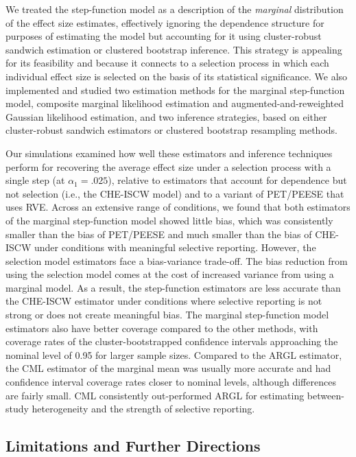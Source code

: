 \documentclass[
  man, donotrepeattitle,floatsintext]{apa7}
\begin{document}
We treated the step-function model as a description of the \emph{marginal} distribution of the effect size estimates, effectively ignoring the dependence structure for purposes of estimating the model but accounting for it using cluster-robust sandwich estimation or clustered bootstrap inference.
This strategy is appealing for its feasibility and because it connects to a selection process in which each individual effect size is selected on the basis of its statistical significance.
We also implemented and studied two estimation methods for the marginal step-function model, composite marginal likelihood estimation and augmented-and-reweighted Gaussian likelihood estimation, and two inference strategies, based on either cluster-robust sandwich estimators or clustered bootstrap resampling methods.

Our simulations examined how well these estimators and inference techniques perform for recovering the average effect size under a selection process with a single step (at \(\alpha_1 = .025\)), relative to estimators that account for dependence but not selection (i.e., the CHE-ISCW model) and to a variant of PET/PEESE that uses RVE.
Across an extensive range of conditions, we found that both estimators of the marginal step-function model showed little bias, which was consistently smaller than the bias of PET/PEESE and much smaller than the bias of CHE-ISCW under conditions with meaningful selective reporting.
However, the selection model estimators face a bias-variance trade-off.
The bias reduction from using the selection model comes at the cost of increased variance from using a marginal model. As a result, the step-function estimators are less accurate than the CHE-ISCW estimator under conditions where selective reporting is not strong or does not create meaningful bias.
The marginal step-function model estimators also have better coverage compared to the other methods, with coverage rates of the cluster-bootstrapped confidence intervals approaching the nominal level of 0.95 for larger sample sizes.
Compared to the ARGL estimator, the CML estimator of the marginal mean was usually more accurate and had confidence interval coverage rates closer to nominal levels, although differences are fairly small.
CML consistently out-performed ARGL for estimating between-study heterogeneity and the strength of selective reporting.

\subsection{Limitations and Further Directions}\label{limitations-and-further-directions}
\end{document}
